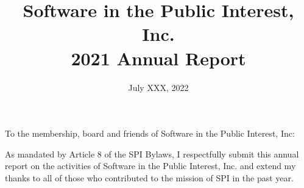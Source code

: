\documentclass[a4paper]{report}
\begin{document}
\title{Software in the Public Interest, Inc.\\
2021 Annual Report}
\date{July XXX, 2022}

\maketitle

\newpage


\hspace{1em}

To the membership, board and friends of Software in the Public Interest, Inc:

As mandated by Article 8 of the SPI Bylaws, I respectfully submit this annual report on the activities of Software in the Public Interest, Inc. and extend my thanks to all of those who contributed to the mission of SPI in the past year.
\end{document}
